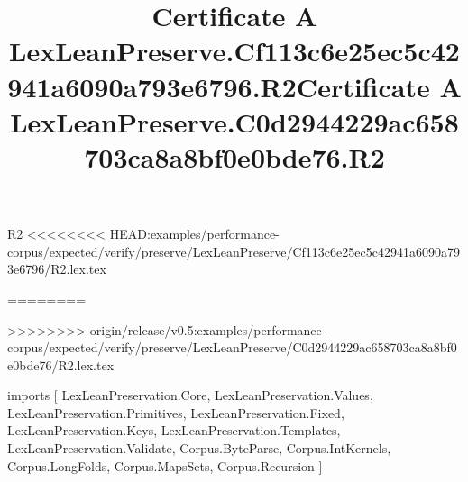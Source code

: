 \begin{lexlean}{R2}
<<<<<<<< HEAD:examples/performance-corpus/expected/verify/preserve/LexLeanPreserve/Cf113c6e25ec5c42941a6090a793e6796/R2.lex.tex
\title{Certificate A LexLeanPreserve.Cf113c6e25ec5c42941a6090a793e6796.R2}
========
\title{Certificate A LexLeanPreserve.C0d2944229ac658703ca8a8bf0e0bde76.R2}
>>>>>>>> origin/release/v0.5:examples/performance-corpus/expected/verify/preserve/LexLeanPreserve/C0d2944229ac658703ca8a8bf0e0bde76/R2.lex.tex
\begin{coremodule}
imports [
  LexLeanPreservation.Core,
  LexLeanPreservation.Values,
  LexLeanPreservation.Primitives,
  LexLeanPreservation.Fixed,
  LexLeanPreservation.Keys,
  LexLeanPreservation.Templates,
  LexLeanPreservation.Validate,
  Corpus.ByteParse,
  Corpus.IntKernels,
  Corpus.LongFolds,
  Corpus.MapsSets,
  Corpus.Recursion
]


\end{coremodule}
\end{lexlean}
